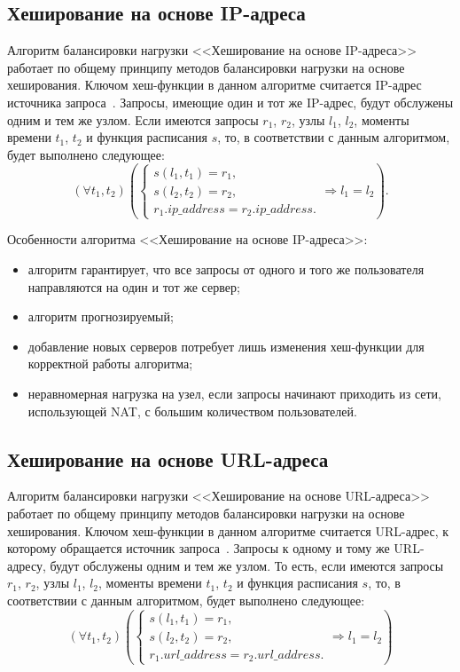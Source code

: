 \subsection*{Хеширование на основе IP-адреса}

Алгоритм балансировки нагрузки <<Хеширование на основе IP-адреса>> работает по общему принципу методов балансировки нагрузки на основе хеширования.
Ключом хеш-функции в данном алгоритме считается IP-адрес источника запроса~\cite{nginx, aws, kemp}.
Запросы, имеющие один и тот же IP-адрес, будут обслужены одним и тем же узлом.
Если имеются запросы $r_1$, $r_2$, узлы $l_1$, $l_2$, моменты времени $t_1$, $t_2$ и функция расписания $s$, то, в соответствии с данным алгоритмом, будет выполнено следующее:
\begin{equation}
	(\forall t_1, t_2) \left(\begin{cases}
		s(l_1, t_1) = r_1, \\
		s(l_2, t_2) = r_2, \\
		r_1.ip\_address = r_2.ip\_address.
	\end{cases} \Rightarrow l_1 = l_2 \right).
\end{equation}

Особенности алгоритма <<Хеширование на основе IP-адреса>>:
\begin{itemize}
	\item алгоритм гарантирует, что все запросы от одного и того же пользователя направляются на один и тот же сервер;
	\item алгоритм прогнозируемый; 
	\item добавление новых серверов потребует лишь изменения хеш-функции для корректной работы алгоритма;
	\item неравномерная нагрузка на узел, если запросы начинают приходить из сети, использующей NAT, с большим количеством пользователей.
\end{itemize}

\subsection*{Хеширование на основе URL-адреса}

Алгоритм балансировки нагрузки <<Хеширование на основе URL-адреса>> работает по общему принципу методов балансировки нагрузки на основе хеширования.
Ключом хеш-функции в данном алгоритме считается URL-адрес, к которому обращается источник запроса~\cite{nginx, kemp, haproxy}.
Запросы к одному и тому же URL-адресу, будут обслужены одним и тем же узлом.
То есть, если имеются запросы $r_1$, $r_2$, узлы $l_1$, $l_2$, моменты времени $t_1$, $t_2$ и функция расписания $s$, то, в соответствии с данным алгоритмом, будет выполнено следующее:
\begin{equation}
	(\forall t_1, t_2) \left(\begin{cases}
		s(l_1, t_1) = r_1, \\
		s(l_2, t_2) = r_2, \\
		r_1.url\_address = r_2.url\_address.
	\end{cases} \Rightarrow l_1 = l_2 \right)
\end{equation}

